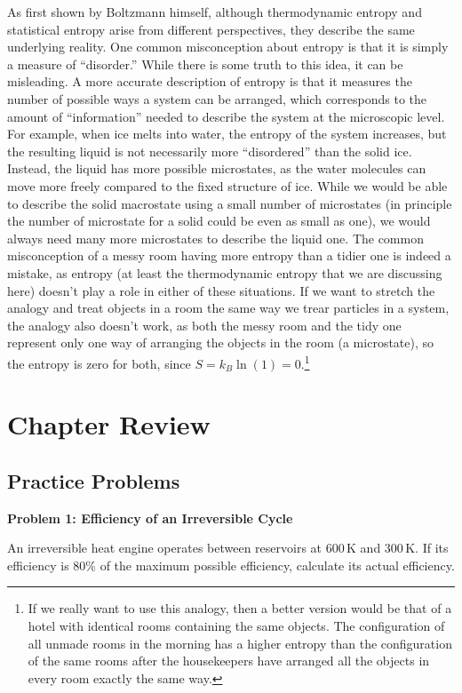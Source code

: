 \documentclass[
  9pt,
]{extbook}
\theoremstyle{definition}
\theoremstyle{definition}
\theoremstyle{definition}
\theoremstyle{definition}
\theoremstyle{remark}
\begin{document}
As first shown by Boltzmann himself, although thermodynamic entropy and statistical entropy arise from different perspectives, they describe the same underlying reality. One common misconception about entropy is that it is simply a measure of ``disorder.'' While there is some truth to this idea, it can be misleading. A more accurate description of entropy is that it measures the number of possible ways a system can be arranged, which corresponds to the amount of ``information'' needed to describe the system at the microscopic level. For example, when ice melts into water, the entropy of the system increases, but the resulting liquid is not necessarily more ``disordered'' than the solid ice. Instead, the liquid has more possible microstates, as the water molecules can move more freely compared to the fixed structure of ice. While we would be able to describe the solid macrostate using a small number of microstates (in principle the number of microstate for a solid could be even as small as one), we would always need many more microstates to describe the liquid one. The common misconception of a messy room having more entropy than a tidier one is indeed a mistake, as entropy (at least the thermodynamic entropy that we are discussing here) doesn't play a role in either of these situations. If we want to stretch the analogy and treat objects in a room the same way we trear particles in a system, the analogy also doesn't work, as both the messy room and the tidy one represent only one way of arranging the objects in the room (a microstate), so the entropy is zero for both, since \(S=k_B \ln(1)=0\).\footnote{If we really want to use this analogy, then a better version would be that of a hotel with identical rooms containing the same objects. The configuration of all unmade rooms in the morning has a higher entropy than the configuration of the same rooms after the housekeepers have arranged all the objects in every room exactly the same way.}

\section{Chapter Review}\label{rev6}

\subsection{Practice Problems}\label{exer6}

\textbf{Problem 1: Efficiency of an Irreversible Cycle}

An irreversible heat engine operates between reservoirs at \(600\,\text{K}\) and \(300\,\text{K}\). If its efficiency is 80\% of the maximum possible efficiency, calculate its actual efficiency.
\end{document}
